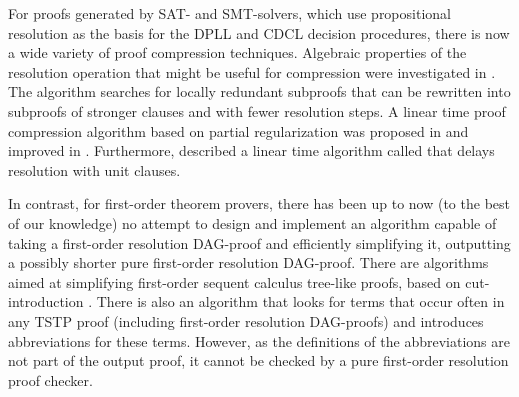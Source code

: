 \documentclass{llncs}
\begin{document}
For proofs generated by SAT- and SMT-solvers, which use propositional resolution as the basis for the DPLL and CDCL decision procedures, there is now a wide variety of proof compression techniques. Algebraic properties of the resolution
operation that might be useful for compression were investigated in \cite{bwp10}.
The {\ReduceReconstruct} algorithm \cite{RedRec} searches for locally redundant
subproofs that can be rewritten into subproofs of stronger clauses and with fewer resolution steps.
A linear time proof compression algorithm based on partial
regularization was proposed in \cite{RP08} and improved in \cite{LURPI}. Furthermore, \cite{LURPI} described a linear time algorithm called {\LowerUnits} that delays resolution with unit clauses.

In contrast, for first-order theorem provers, there has been up to now (to the best of our knowledge) no attempt to design and implement an algorithm capable of taking a first-order resolution DAG-proof and efficiently simplifying it, outputting a possibly shorter pure first-order resolution DAG-proof. There are algorithms aimed at simplifying first-order sequent calculus tree-like proofs, based on cut-introduction \cite{BrunoLPAR,Hetzl}.
There is also an algorithm \cite{LPARCzech} that looks for terms that occur often in any TSTP \cite{TPTP} proof (including first-order resolution DAG-proofs) and introduces abbreviations for these terms. However, as the definitions of the abbreviations are not part of the output proof, it cannot be checked by a pure first-order resolution proof checker.
\end{document}
